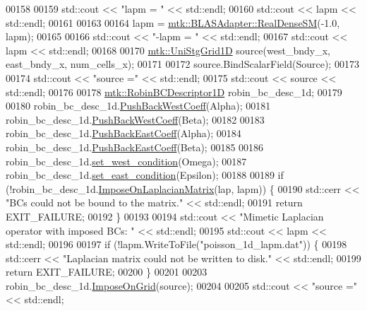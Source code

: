 \begin{DoxyCode}
00158 
00159   std::cout << \textcolor{stringliteral}{"lapm = "} << std::endl;
00160   std::cout << lapm << std::endl;
00161 
00163 
00164   lapm = \hyperlink{classmtk_1_1BLASAdapter_a0dd80d043615a95f11b7341ce69b44d3}{mtk::BLASAdapter::RealDenseSM}(-1.0, lapm);
00165 
00166   std::cout << \textcolor{stringliteral}{"-lapm = "} << std::endl;
00167   std::cout << lapm << std::endl;
00168 
00170   \hyperlink{classmtk_1_1UniStgGrid1D}{mtk::UniStgGrid1D} source(west\_bndy\_x, east\_bndy\_x, num\_cells\_x);
00171 
00172   source.BindScalarField(Source);
00173 
00174   std::cout << \textcolor{stringliteral}{"source ="} << std::endl;
00175   std::cout << source << std::endl;
00176 
00178   \hyperlink{classmtk_1_1RobinBCDescriptor1D}{mtk::RobinBCDescriptor1D} robin\_bc\_desc\_1d;
00179 
00180   robin\_bc\_desc\_1d.\hyperlink{classmtk_1_1RobinBCDescriptor1D_acdf8a75f8c39b3b8a032af81e0fd2e89}{PushBackWestCoeff}(Alpha);
00181   robin\_bc\_desc\_1d.\hyperlink{classmtk_1_1RobinBCDescriptor1D_acdf8a75f8c39b3b8a032af81e0fd2e89}{PushBackWestCoeff}(Beta);
00182 
00183   robin\_bc\_desc\_1d.\hyperlink{classmtk_1_1RobinBCDescriptor1D_a7791c11e0950656cb5608a77918c28d4}{PushBackEastCoeff}(Alpha);
00184   robin\_bc\_desc\_1d.\hyperlink{classmtk_1_1RobinBCDescriptor1D_a7791c11e0950656cb5608a77918c28d4}{PushBackEastCoeff}(Beta);
00185 
00186   robin\_bc\_desc\_1d.\hyperlink{classmtk_1_1RobinBCDescriptor1D_a06bfaf0126d528247c3c76fdd19f4b85}{set\_west\_condition}(Omega);
00187   robin\_bc\_desc\_1d.\hyperlink{classmtk_1_1RobinBCDescriptor1D_a4edc92eeaaaa3f1e7f2cedfea3d35681}{set\_east\_condition}(Epsilon);
00188 
00189   \textcolor{keywordflow}{if} (!robin\_bc\_desc\_1d.\hyperlink{classmtk_1_1RobinBCDescriptor1D_ab8446428df923c27f388a85bd3f2c6d4}{ImposeOnLaplacianMatrix}(lap, lapm)) \{
00190     std::cerr << \textcolor{stringliteral}{"BCs  could not be bound to the matrix."} << std::endl;
00191     \textcolor{keywordflow}{return} EXIT\_FAILURE;
00192   \}
00193 
00194   std::cout << \textcolor{stringliteral}{"Mimetic Laplacian operator with imposed BCs: "} << std::endl;
00195   std::cout << lapm << std::endl;
00196 
00197   \textcolor{keywordflow}{if} (!lapm.WriteToFile(\textcolor{stringliteral}{"poisson\_1d\_lapm.dat"})) \{
00198     std::cerr << \textcolor{stringliteral}{"Laplacian matrix could not be written to disk."} << std::endl;
00199     \textcolor{keywordflow}{return} EXIT\_FAILURE;
00200   \}
00201 
00203   robin\_bc\_desc\_1d.\hyperlink{classmtk_1_1RobinBCDescriptor1D_ab0daec1d6c5c9c6768bea08281a3831d}{ImposeOnGrid}(source);
00204 
00205   std::cout << \textcolor{stringliteral}{"source ="} << std::endl;

\end{DoxyCode}
